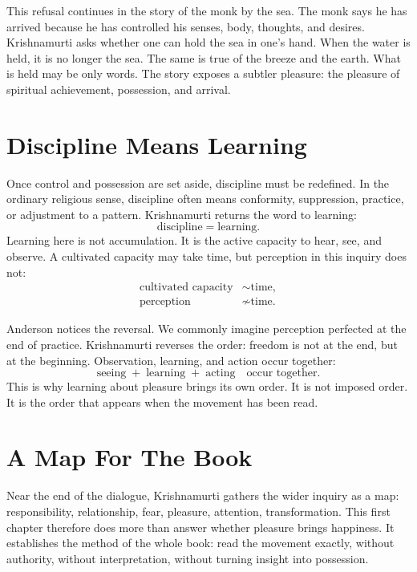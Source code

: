 \documentclass[11pt,oneside]{book}
\begin{document}
This refusal continues in the story of the monk by the sea. The monk says he has arrived because he has controlled his senses, body, thoughts, and desires. Krishnamurti asks whether one can hold the sea in one's hand. When the water is held, it is no longer the sea. The same is true of the breeze and the earth. What is held may be only words. The story exposes a subtler pleasure: the pleasure of spiritual achievement, possession, and arrival.

\section{Discipline Means Learning}

Once control and possession are set aside, discipline must be redefined. In the ordinary religious sense, discipline often means conformity, suppression, practice, or adjustment to a pattern. Krishnamurti returns the word to learning:
\begin{equation}
\text{discipline} = \text{learning}.
\end{equation}
Learning here is not accumulation. It is the active capacity to hear, see, and observe. A cultivated capacity may take time, but perception in this inquiry does not:
\begin{align}
\text{cultivated capacity} &\sim \text{time},\\
\text{perception} &\not\sim \text{time}.
\end{align}

Anderson notices the reversal. We commonly imagine perception perfected at the end of practice. Krishnamurti reverses the order: freedom is not at the end, but at the beginning. Observation, learning, and action occur together:
\begin{equation}
\text{seeing} \;+\; \text{learning} \;+\; \text{acting}
\quad \text{occur together}.
\end{equation}
This is why learning about pleasure brings its own order. It is not imposed order. It is the order that appears when the movement has been read.

\section{A Map For The Book}

Near the end of the dialogue, Krishnamurti gathers the wider inquiry as a map: responsibility, relationship, fear, pleasure, attention, transformation. This first chapter therefore does more than answer whether pleasure brings happiness. It establishes the method of the whole book: read the movement exactly, without authority, without interpretation, without turning insight into possession.
\end{document}
